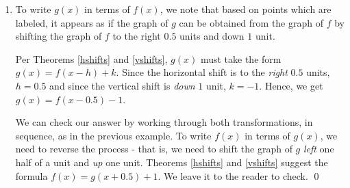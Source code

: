 \documentclass{ximera}
\begin{document}
\begin{example}
\begin{enumerate}
\begin{enumerate}
\[\begin{array}{ccc}
& 


\begin{mfpic}[15]{-4}{6}{-3}{5}
\axes
\tlabel[cc](6,-0.5){\scriptsize $x$}
\tlabel[cc](0.5,5){\scriptsize $y$}
\xmarks{-3,-2, -1, 0, 1, 2, 3, 4,5}
\ymarks{-2, -1, 0, 1, 2, 3,4}
\tcaption{\scriptsize $y = f(x+1)-2=F(x)$}
\tlpointsep{4pt}
\scriptsize
\tlabel[cc](-3.25, -2.5){$(-3,-2)$}
\tlabel[cc](-2, 1){$(1,1)$}
\tlabel[cc](1, 2.5){$(1,2)$}
\tlabel[cc](3, 0.5){$(3,2)$}
\axislabels {x}{{$1$} 1, {$2$} 2,  {$3$} 3,{$4$} 4, {$5$} 5, {\scriptsize $-1\hspace{7pt}$} -1}
\axislabels {y}{{$2$} 2,{$1$} 1,{$4$} 4,{$-1$} -1,{$-2$} -2, ,{$3$} 3}
\normalsize
\penwd{1.25pt}
\function{-3, 3, 0.1}{((x+3)*(5-x)/4)-2}
\point[4pt]{(-3,-2), (1,2), (-1,1)}
\pointfillfalse
\point[4pt]{(3,1)}
\end{mfpic}

\end{array}\]

To check, we start with the point $(-3, -2)$.  We find when we substitute $x=-3$ into the equation $y=f(x+1)-2$ we get $y = f(-3+1)-2 = f(-2)-2$.  Since $(-2,0)$ is on the graph of $f$, we know $f(-2) =0$, so  $y = f(-3+1)-2 = f(-2)-2 = 0 - 2 = -2$.  This proves $(-3,-2)$ is on the graph of $y=f(x+1)-2$.  We leave the checks of the remaining points to the reader.

\end{enumerate}

\item  To write $g(x)$ in terms of $f(x)$, we note that based on points which are labeled, it appears as if the graph of $g$ can be obtained from the graph of $f$ by shifting the graph of $f$ to the right $0.5$ units and down $1$ unit.  

\smallskip

Per Theorems \ref{hshifts} and \ref{vshifts}, $g(x)$ must take the form $g(x) = f(x-h)+k$.  Since the horizontal shift is to the \textit{right} $0.5$ units, $h = 0.5$ and since the vertical shift is \textit{down} $1$ unit, $k = -1$.   Hence, we get $g(x) = f(x-0.5)-1$.  

\smallskip

We can check our answer by working through both transformations, in sequence, as in the previous example.   To write $f(x)$ in terms of $g(x)$, we need to reverse the process - that is, we need to shift the graph of $g$ \textit{left} one half of a unit and \textit{up} one unit.   Theorems \ref{hshifts} and \ref{vshifts} suggest the formula $f(x) = g(x+0.5)+1$.  We leave it to the reader to check. \qed
  
 \end{enumerate}
 
 \end{example}
 
\end{document}
